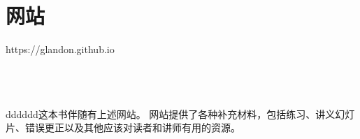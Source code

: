 \chapter*{网站}

\centerline{https://glandon.github.io}

\ \\
\ \\
\ \\
dddddd这本书伴随有上述网站。
网站提供了各种补充材料，包括练习、讲义幻灯片、错误更正以及其他应该对读者和讲师有用的资源。
